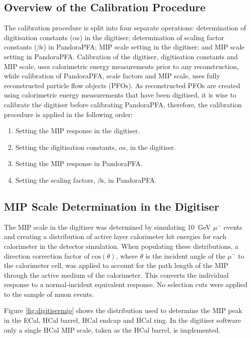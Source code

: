 \subsection{Overview of the Calibration Procedure}
\label{sec:ordercalibration}
The calibration procedure is split into four separate operations: determination of digitisation constants ($\alpha$s) in the digitiser; determination of scaling factor constants ($\beta$s) in PandoraPFA; MIP scale setting in the digitiser; and MIP scale setting in PandoraPFA.  Calibration of the digitiser, digitisation constants and MIP scale, uses calorimetric energy measurements prior to any reconstruction, while calibration of PandoraPFA, scale factors and MIP scale, uses fully reconstructed particle flow objects (PFOs).  As reconstructed PFOs are created using calorimetric energy measurements that have been digitised, it is wise to calibrate the digitiser before calibrating PandoraPFA, therefore, the calibration procedure is applied in the following order:
\begin{enumerate} 
\item Setting the MIP response in the digitiser.  
\item Setting the digitisation constants, $\alpha$s, in the digitiser.  
\item Setting the MIP response in PandoraPFA.  
\item Setting the scaling factors, $\beta$s, in PandoraPFA.  
\end{enumerate} 


\subsection{MIP Scale Determination in the Digitiser}
\label{sec:mipresponse}
The MIP scale in the digitiser was determined by simulating 10~GeV $\mu^{-}$ events and creating a distribution of active layer calorimeter hit energies for each calorimeter in the detector simulation.  When populating these distributions, a direction correction factor of $\text{cos}(\theta)$, where $\theta$ is the incident angle of the $\mu^{-}$ to the calorimeter cell, was applied to account for the path length of the MIP through the active medium of the calorimeter.  This converts the individual response to a normal-incident equivalent response.  No selection cuts were applied to the sample of muon events.  

Figure \ref{fig:digitisermip} shows the distribution used to determine the MIP peak in the ECal, HCal barrel, HCal endcap and HCal ring.  In the digitiser software only a single HCal MIP scale, taken as the HCal barrel, is implemented.  

